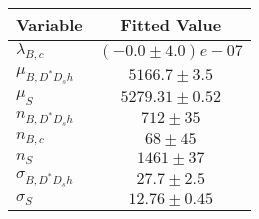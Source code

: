 \begin{tabular}[t]{lc}
\hline
Variable &Fitted Value\\
\hline\hline
$\lambda_{B,c}$&$(-0.0\pm4.0)e-07$\\
\hline
$\mu_{B, D^* D_s h}$&$5166.7\pm3.5$\\
\hline
$\mu_S$&$5279.31\pm0.52$\\
\hline
$n_{B, D^* D_s h}$&$712\pm35$\\
\hline
$n_{B,c}$&$68\pm45$\\
\hline
$n_S$&$1461\pm37$\\
\hline
$\sigma_{B, D^* D_s h}$&$27.7\pm2.5$\\
\hline
$\sigma_S$&$12.76\pm0.45$\\
\hline
\end{tabular}
